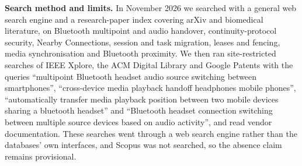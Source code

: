 \documentclass[conference]{IEEEtran}
\begin{document}
\textbf{Search method and limits.} In November 2026 we searched with a general web search engine and a research-paper index covering arXiv and biomedical literature, on Bluetooth multipoint and audio handover, continuity-protocol security, Nearby Connections, session and task migration, leases and fencing, media synchronisation and Bluetooth proximity. We then ran site-restricted searches of IEEE Xplore, the ACM Digital Library and Google Patents with the queries ``multipoint Bluetooth headset audio source switching between smartphones'', ``cross-device media playback handoff headphones mobile phones'', ``automatically transfer media playback position between two mobile devices sharing a bluetooth headset'' and ``Bluetooth headset connection switching between multiple source devices based on audio activity'', and read vendor documentation. These searches went through a web search engine rather than the databases' own interfaces, and Scopus was not searched, so the absence claim remains provisional.
\end{document}
